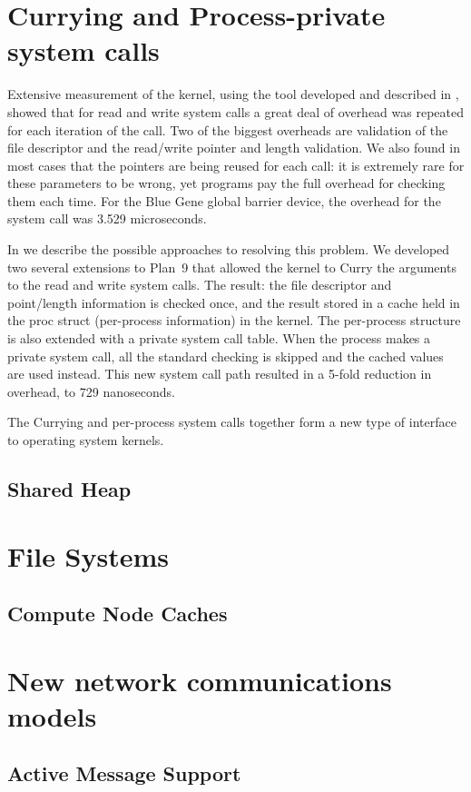 \section{Currying and Process-private system calls}
Extensive measurement of the kernel, using the tool developed and described in \cite{plan9trace}, showed
that for read and write system calls a great deal of overhead was repeated for each iteration of the 
call. Two of the biggest overheads are validation of the file descriptor and the read/write pointer and 
length validation. We also found in most cases that the pointers are being reused for each call: it is extremely rare for these parameters to be wrong, yet programs pay the full overhead for checking them 
each time. For the Blue Gene global barrier device, the overhead for the system call was 3.529 microseconds. 

In \cite{currying} we describe the possible approaches to resolving this problem. We developed two 
several extensions to Plan~9 that allowed the kernel to Curry the arguments to the read and write
system calls. The result: the file descriptor and point/length information is checked once, and the
result stored in a cache held in the proc struct (per-process information) in the kernel. The per-process structure is 
also extended with a private system call table. When the process makes a private system
call, all the standard checking is skipped and the cached values are used instead. This 
new system call path resulted in a 5-fold reduction in overhead, to 729 nanoseconds. 

The Currying and per-process system calls together form a new type of interface to operating system
kernels. 

\subsection{Shared Heap}
\section{File Systems}
\subsection{Compute Node Caches}
\section{New network communications models}
\subsection{Active Message Support}
